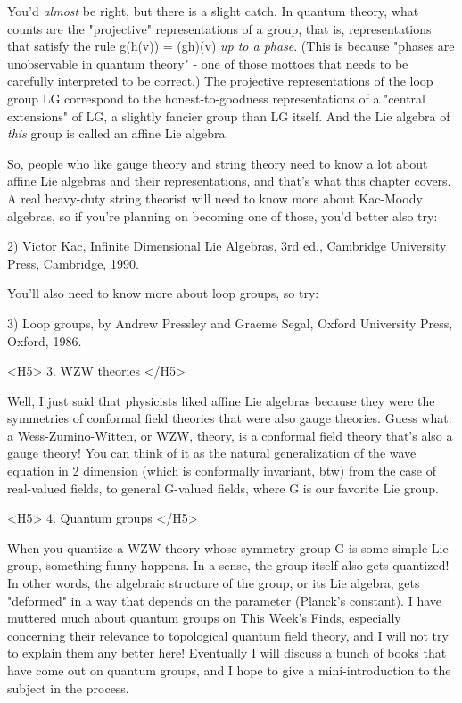 You'd \emph{almost} be right, but there is a slight catch.  In quantum
theory, what counts are the "projective" representations of a group,
that is, representations that satisfy the rule g(h(v)) = (gh)(v) 
\emph{up to a phase}.  (This is because "phases are unobservable in quantum
theory" - one of those mottoes that needs to be carefully interpreted
to be correct.)  The projective representations of the loop group LG
correspond to the honest-to-goodness representations of a "central
extensions" of LG, a slightly fancier group than LG itself.  And the
Lie algebra of \emph{this} group is called an affine Lie algebra.

So, people who like gauge theory and string theory need to know a
lot about affine Lie algebras and their representations, and that's
what this chapter covers.  A real heavy-duty string theorist will
need to know more about Kac-Moody algebras, so if you're planning
on becoming one of those, you'd better also try:

2) Victor Kac, Infinite Dimensional Lie Algebras, 3rd ed.,
Cambridge University Press, Cambridge, 1990.

You'll also need to know more about loop groups, so try:

3) Loop groups, by Andrew Pressley and Graeme Segal, Oxford University
Press, Oxford, 1986. 

<H5> 3.  WZW theories </H5>

Well, I just said that physicists liked affine Lie algebras because they
were the symmetries of conformal field theories that were also gauge
theories.  Guess what: a Wess-Zumino-Witten, or WZW, theory, is a
conformal field theory that's also a gauge theory!  You can think of it
as the natural generalization of the wave equation in 2 dimension (which
is conformally invariant, btw) from the case of real-valued fields, to
general G-valued fields, where G is our favorite Lie group.  

<H5> 4.  Quantum groups </H5>

When you quantize a WZW theory whose symmetry group G is some simple
Lie group, something funny happens.  In a sense, the group itself
also gets quantized!  In other words, the algebraic structure of
the group, or its Lie algebra, gets "deformed" in a way that depends on 
the parameter \hbar  (Planck's constant).  I have muttered much about
quantum groups on This Week's Finds, especially concerning their
relevance to topological quantum field theory, and I will not try to
explain them any better here!  Eventually I will discuss a bunch of
books that have come out on quantum groups, and I hope to give
a mini-introduction to the subject in the process.

